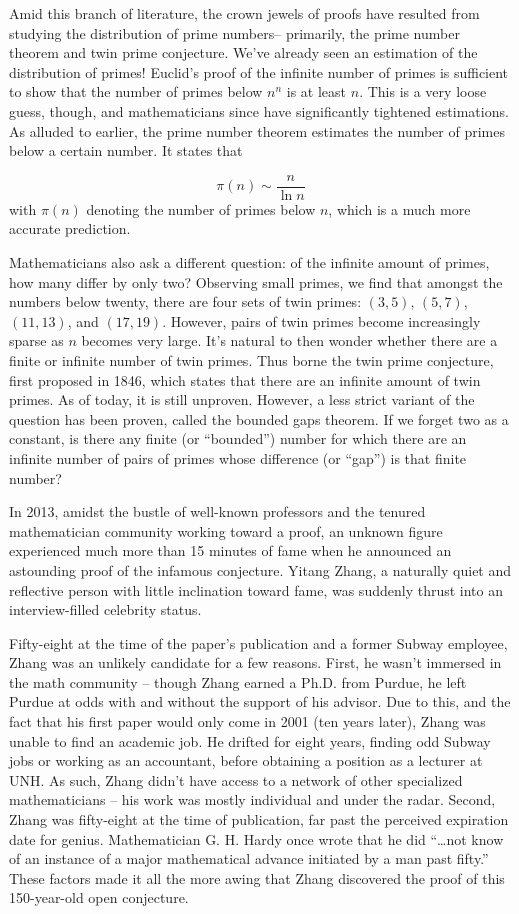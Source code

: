 \documentclass{article}
\begin{document}
Amid this branch of literature, the crown jewels of proofs have resulted from studying the distribution of prime numbers– primarily, the prime number theorem and twin prime conjecture. We’ve already seen an estimation of the distribution of primes! Euclid’s proof of the infinite number of primes is sufficient to show that the number of primes below $n^n$ is at least $n$. This is a very loose guess, though, and mathematicians since have significantly tightened estimations. As alluded to earlier, the prime number theorem estimates the number of primes below a certain number. It states that

\[
\pi (n) \sim \frac n{\ln n}
\]
with $\pi(n)$ denoting the number of primes below $n$, which is a much more accurate prediction. 

Mathematicians also ask a different question: of the infinite amount of primes, how many differ by only two? Observing small primes, we find that amongst the numbers below twenty, there are four sets of twin primes: $(3, 5)$, $(5, 7)$, $(11, 13)$, and $(17, 19)$. However, pairs of twin primes become increasingly sparse as $n$ becomes very large. It’s natural to then wonder whether there are a finite or infinite number of twin primes. Thus borne the twin prime conjecture, first proposed in 1846, which states that there are an infinite amount of twin primes. As of today, it is still unproven. However, a less strict variant of the question has been proven, called the bounded gaps theorem. If we forget two as a constant, is there any finite (or “bounded”) number for which there are an infinite number of pairs of primes whose difference (or “gap”) is that finite number?

In 2013, amidst the bustle of well-known professors and the tenured mathematician community working toward a proof, an unknown figure experienced much more than 15 minutes of fame when he announced an astounding proof of the infamous conjecture. Yitang Zhang, a naturally quiet and reflective person with little inclination toward fame, was suddenly thrust into an interview-filled celebrity status. 

Fifty-eight at the time of the paper's publication and a former Subway employee, Zhang was an unlikely candidate for a few reasons. First, he wasn’t immersed in the math community – though Zhang earned a Ph.D. from Purdue, he left Purdue at odds with and without the support of his advisor. Due to this, and the fact that his first paper would only come in 2001 (ten years later), Zhang was unable to find an academic job. He drifted for eight years, finding odd Subway jobs or working as an accountant, before obtaining a position as a lecturer at UNH. As such, Zhang didn’t have access to a network of other specialized mathematicians – his work was mostly individual and under the radar. Second, Zhang was fifty-eight at the time of publication, far past the perceived expiration date for genius. Mathematician G. H. Hardy once wrote that he did “\dots not know of an instance of a major mathematical advance initiated by a man past fifty.” These factors made it all the more awing that Zhang discovered the proof of this 150-year-old open conjecture.
\end{document}
